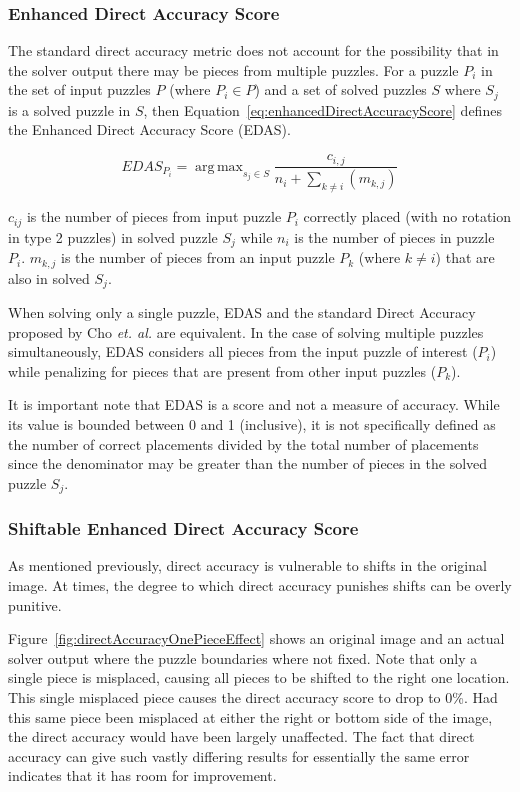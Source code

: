 \documentclass{report}
\DeclareMathOperator*{\argmax}{arg\,max} %
\begin{document}
\subsubsection{Enhanced Direct Accuracy Score}\label{sec:enhancedDirectAccuracyScore}

The standard direct accuracy metric does not account for the possibility that in the solver output there may be pieces from multiple puzzles.  For a puzzle $P_i$ in the set of input puzzles $P$ (where $P_i \in P$) and a set of solved puzzles $S$ where $S_j$ is a solved puzzle in $S$, then Equation~\ref{eq:enhancedDirectAccuracyScore} defines the Enhanced Direct Accuracy Score (EDAS).

\begin{equation} \label{eq:enhancedDirectAccuracyScore}
EDAS_{P_i} = \argmax_{s_j \in S}\frac{c_{i,j}}{n_i + \sum_{k \ne i}(m_{k,j})}
\end{equation}

$c_{ij}$ is the number of pieces from input puzzle $P_i$ correctly placed (with no rotation in type 2 puzzles) in solved puzzle $S_j$ while $n_i$ is the number of pieces in puzzle $P_i$. $m_{k,j}$ is the number of pieces from an input puzzle $P_k$ (where $k \ne i$) that are also in solved $S_j$.

When solving only a single puzzle, EDAS and the standard Direct Accuracy proposed by Cho \textit{et. al.} are equivalent.  In the case of solving multiple puzzles simultaneously, EDAS considers all pieces from the input puzzle of interest ($P_i$) while penalizing for pieces that are present from other input puzzles ($P_k$). 

It is important note that EDAS is a score and not a measure of accuracy. While its value is bounded between 0 and 1 (inclusive), it is not specifically defined as the number of correct placements divided by the total number of placements since the denominator may be greater than the number of pieces in the solved puzzle $S_j$.

\subsubsection{Shiftable Enhanced Direct Accuracy Score}\label{sec:shiftableEnhancedDirectAccuracy}

As mentioned previously, direct accuracy is vulnerable to shifts in the original image.  At times, the degree to which direct accuracy punishes shifts can be overly punitive. 

Figure~\ref{fig:directAccuracyOnePieceEffect} shows an original image and an actual solver output where the puzzle boundaries where not fixed.  Note that only a single piece is misplaced, causing all pieces to be shifted to the right one location.  This single misplaced piece causes the direct accuracy score to drop to 0\%.  Had this same piece been misplaced at either the right or bottom side of the image, the direct accuracy would have been largely unaffected.  The fact that direct accuracy can give such vastly differing results for essentially the same error indicates that it has room for improvement.
\end{document}
